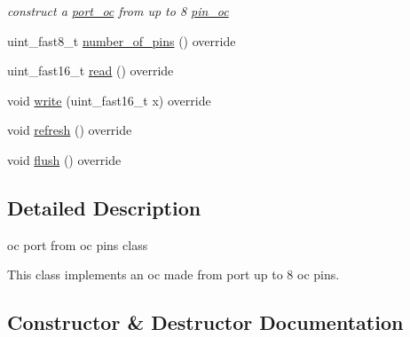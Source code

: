 \begin{DoxyCompactItemize}
\begin{DoxyCompactList}\small\item\em construct a \hyperlink{classhwlib_1_1port__oc}{port\+\_\+oc} from up to 8 \hyperlink{classhwlib_1_1pin__oc}{pin\+\_\+oc} \end{DoxyCompactList}\item 
uint\+\_\+fast8\+\_\+t \hyperlink{classhwlib_1_1port__oc__from__pins__t_ae366a1c7b3790e5f0c78c8be813050d8}{number\+\_\+of\+\_\+pins} () override
\item 
uint\+\_\+fast16\+\_\+t \hyperlink{classhwlib_1_1port__oc__from__pins__t_a9bd46a2c70ab338350e899b757e6422c}{read} () override
\item 
void \hyperlink{classhwlib_1_1port__oc__from__pins__t_af1ad5780f01e5c09d9797e69d9b35523}{write} (uint\+\_\+fast16\+\_\+t x) override
\item 
void \hyperlink{classhwlib_1_1port__oc__from__pins__t_ad60c497bf92c66a9243cb933db663837}{refresh} () override
\item 
void \hyperlink{classhwlib_1_1port__oc__from__pins__t_a981ca49914dc15275d775cb86b4742d5}{flush} () override
\end{DoxyCompactItemize}


\subsection{Detailed Description}
oc port from oc pins class 

This class implements an oc made from port up to 8 oc pins. 

\subsection{Constructor \& Destructor Documentation}
\mbox{\label{classhwlib_1_1port__oc__from__pins__t_a984eb0629f195edf8f1b635402c5575e}} 
